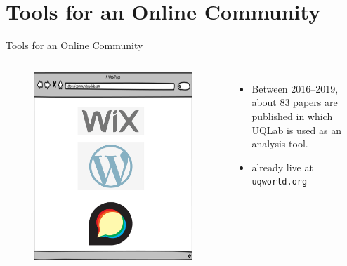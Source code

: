 \documentclass[]{rsuqbeamernew}
\begin{document}
\section{Tools for an Online Community}

\begin{frame}[t]{Tools for an Online Community}

  \begin{columns}
    \begin{minipage}[c][0.80\textheight][c]{\linewidth}
      \begin{figure}
        \centering
        \includegraphics[width=1.0\linewidth]{../figures/communityPlatform}
      \end{figure}
    \end{minipage}
      
  \begin{itemize}
    \item Between 2016--2019, about 83 papers are published in which UQLab is used as an analysis tool.
    \item already live at \texttt{uqworld.org}
  \end{itemize}
  \hfill
 \end{columns}

\end{frame}
  
\end{document}
